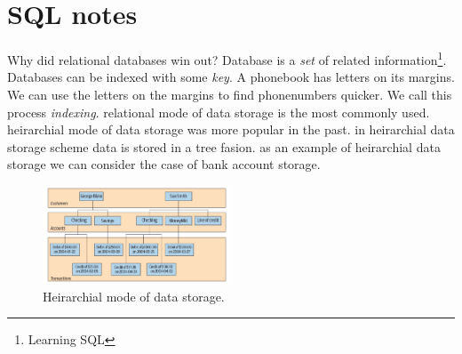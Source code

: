\documentclass[a4paper]{article}
\begin{document}
\section*{SQL notes}

\lstset{style=custom-sql}

Why did relational databases win out? Database is a \emph{set} of related information\footnote{Learning SQL}. Databases can
be indexed with some \emph{key}. A phonebook has letters on its margins. We can use the letters on the margins to find
phonenumbers quicker. We call this process \emph{indexing}. relational mode of data storage is the most commonly used.
heirarchial mode of data storage was more popular in the past. in heirarchial data storage scheme data is stored in a tree 
fasion. as an example of heirarchial data storage we can consider the case of bank account storage.

\begin{figure}[hbt!]
    \centering
    \includegraphics[width=0.5\textwidth]{graphics/heirarchial-database.png}
    \caption{Heirarchial mode of data storage.}
\end{figure}
\end{document}
